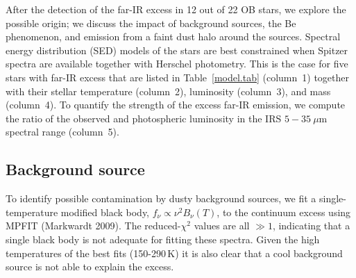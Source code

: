 \documentclass[tradiabstract]{aa} %
\begin{document}
After the detection of the far-IR excess in{ 12 out of 22} OB stars,
we{ explore} the possible origin; we discuss the impact of background
sources, the Be phenomenon, and emission from a faint dust halo around
the sources. {Spectral energy distribution (SED) models} of the
stars are best constrained when Spitzer spectra are available together
with Herschel photometry. This is the case for five stars with far-IR
excess that are listed in Table~\ref{model.tab} (column~1) together
with their stellar temperature (column~2), luminosity (column~3), and
mass (column~4). To quantify the strength of the excess far-IR
emission, we compute{ the ratio of the observed and photospheric
  luminosity in the IRS $5 - 35 \ \mu$m spectral range} (column~5).

\subsection{Background source}

To identify possible contamination by dusty background sources, we fit
a single-temperature modified black body, $f_{\nu} \propto \nu ^{2}
B_{\nu}(T)$, to the continuum excess using MPFIT (Markwardt 2009). The
reduced-$\chi^2$ values are all $\gg 1$, indicating that a single
black body is not adequate for fitting these spectra. Given the high
temperatures of the best fits (150-290\,K) it is also clear that a
cool background source is not able to explain the excess.
\end{document}
